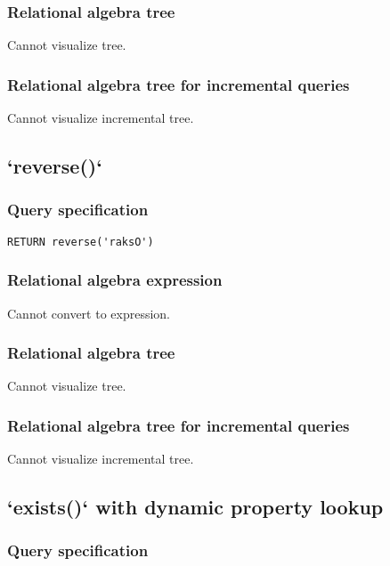 \subsubsection*{Relational algebra tree}

Cannot visualize tree.

\subsubsection*{Relational algebra tree for incremental queries}

Cannot visualize incremental tree.

\subsection{`reverse()`}

\subsubsection*{Query specification}

\begin{lstlisting}
RETURN reverse('raksO')
\end{lstlisting}

\subsubsection*{Relational algebra expression}

Cannot convert to expression.

\subsubsection*{Relational algebra tree}

Cannot visualize tree.

\subsubsection*{Relational algebra tree for incremental queries}

Cannot visualize incremental tree.

\subsection{`exists()` with dynamic property lookup}

\subsubsection*{Query specification}

